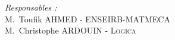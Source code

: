 \begin{titlepage}
\begin{center}
\begin{center}
\begin{center}
                    
                    \begin{flushright} 
                      \large
                      \emph{Responsables :} \\
                      M.~Toufik \textsc{AHMED - ENSEIRB-MATMECA} \\
                      M.~Christophe \textsc{ARDOUIN - Logica}
                    \end{flushright}
                  \end{center}
                  
                  
                  
                  
                  
  \end{center}    
\end{center}
\end{titlepage}
